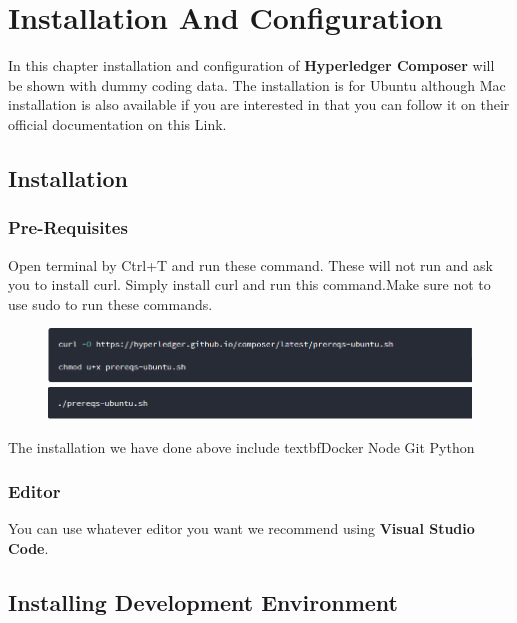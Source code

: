 \chapter{Installation And Configuration
	\label{ch:Installation And Configuration}}

In this chapter installation and configuration of \textbf{Hyperledger Composer }will be shown with dummy coding data.
The installation is for Ubuntu although Mac installation is also available if you are interested in that you can follow it on their official documentation on this Link.

\section{Installation}
\subsection{Pre-Requisites}
Open terminal by Ctrl+T and run these command. These will not run and ask you to install curl. Simply install curl and run this command.Make sure not to use sudo to run these commands.
\begin{figure}[h]
	\centering
	\includegraphics[width=450px]{figures/installation/1.png}
	\includegraphics[width=450px]{figures/installation/2.png}
\end{figure}

The installation we have done above include textbf{Docker Node Git Python}
\subsection{Editor}
You can use whatever editor you want we recommend using \textbf{Visual Studio Code}.
\section{Installing Development Environment}
